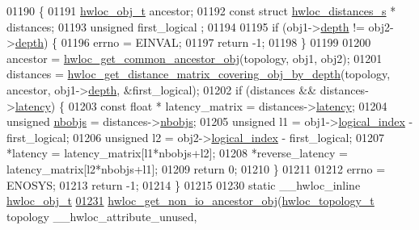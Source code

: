 \begin{DoxyCode}
01190 \{
01191   \hyperlink{a00016}{hwloc_obj_t} ancestor;
01192   \textcolor{keyword}{const} \textcolor{keyword}{struct }\hyperlink{a00014}{hwloc_distances_s} * distances;
01193   \textcolor{keywordtype}{unsigned} first\_logical ;
01194 
01195   \textcolor{keywordflow}{if} (obj1->\hyperlink{a00016_a9d82690370275d42d652eccdea5d3ee5}{depth} != obj2->\hyperlink{a00016_a9d82690370275d42d652eccdea5d3ee5}{depth}) \{
01196     errno = EINVAL;
01197     \textcolor{keywordflow}{return} -1;
01198   \}
01199 
01200   ancestor = \hyperlink{a00053_ga52a334f17c6b5b409d5cc6bb4ab8a2ab}{hwloc_get_common_ancestor_obj}(topology, obj1, obj2);
01201   distances = \hyperlink{a00063_ga186ac2711b98a12cf46d58cd005fbb51}{hwloc_get_distance_matrix_covering_obj_by_depth}(topology, ancestor,
       obj1->\hyperlink{a00016_a9d82690370275d42d652eccdea5d3ee5}{depth}, &first\_logical);
01202   \textcolor{keywordflow}{if} (distances && distances->\hyperlink{a00014_a0f70f48d1bfb18e5e2008825da2967c9}{latency}) \{
01203     \textcolor{keyword}{const} \textcolor{keywordtype}{float} * latency\_matrix = distances->\hyperlink{a00014_a0f70f48d1bfb18e5e2008825da2967c9}{latency};
01204     \textcolor{keywordtype}{unsigned} \hyperlink{a00014_a4ca2af858cebbce7324ec49903d09474}{nbobjs} = distances->\hyperlink{a00014_a4ca2af858cebbce7324ec49903d09474}{nbobjs};
01205     \textcolor{keywordtype}{unsigned} l1 = obj1->\hyperlink{a00016_a0d07fb7b8935e137c94d75a3eb492ae9}{logical_index} - first\_logical;
01206     \textcolor{keywordtype}{unsigned} l2 = obj2->\hyperlink{a00016_a0d07fb7b8935e137c94d75a3eb492ae9}{logical_index} - first\_logical;
01207     *latency = latency\_matrix[l1*nbobjs+l2];
01208     *reverse\_latency = latency\_matrix[l2*nbobjs+l1];
01209     \textcolor{keywordflow}{return} 0;
01210   \}
01211 
01212   errno = ENOSYS;
01213   \textcolor{keywordflow}{return} -1;
01214 \}
01215 
01230 \textcolor{keyword}{static} \_\_hwloc\_inline \hyperlink{a00016}{hwloc_obj_t}
\hypertarget{a00031_source_l01231}{}\hyperlink{a00064_ga3603275746a8792e54415d79763aa9e9}{01231} \hyperlink{a00064_ga3603275746a8792e54415d79763aa9e9}{hwloc_get_non_io_ancestor_obj}(\hyperlink{a00039_ga9d1e76ee15a7dee158b786c30b6a6e38}{hwloc_topology_t} topology \_\_hwloc\_attribute\_unused,
      

\end{DoxyCode}
